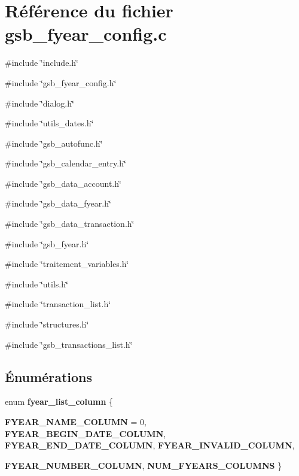 \section{Référence du fichier gsb\_\-fyear\_\-config.c}
\label{gsb__fyear__config_8c}
{\ttfamily \#include \char`\"{}include.h\char`\"{}}\par
{\ttfamily \#include \char`\"{}gsb\_\-fyear\_\-config.h\char`\"{}}\par
{\ttfamily \#include \char`\"{}dialog.h\char`\"{}}\par
{\ttfamily \#include \char`\"{}utils\_\-dates.h\char`\"{}}\par
{\ttfamily \#include \char`\"{}gsb\_\-autofunc.h\char`\"{}}\par
{\ttfamily \#include \char`\"{}gsb\_\-calendar\_\-entry.h\char`\"{}}\par
{\ttfamily \#include \char`\"{}gsb\_\-data\_\-account.h\char`\"{}}\par
{\ttfamily \#include \char`\"{}gsb\_\-data\_\-fyear.h\char`\"{}}\par
{\ttfamily \#include \char`\"{}gsb\_\-data\_\-transaction.h\char`\"{}}\par
{\ttfamily \#include \char`\"{}gsb\_\-fyear.h\char`\"{}}\par
{\ttfamily \#include \char`\"{}traitement\_\-variables.h\char`\"{}}\par
{\ttfamily \#include \char`\"{}utils.h\char`\"{}}\par
{\ttfamily \#include \char`\"{}transaction\_\-list.h\char`\"{}}\par
{\ttfamily \#include \char`\"{}structures.h\char`\"{}}\par
{\ttfamily \#include \char`\"{}gsb\_\-transactions\_\-list.h\char`\"{}}\par
\subsection*{Énumérations}
\begin{DoxyCompactItemize}
\item 
enum {\bf fyear\_\-list\_\-column} \{ \par
{\bf FYEAR\_\-NAME\_\-COLUMN} =  0, 
{\bf FYEAR\_\-BEGIN\_\-DATE\_\-COLUMN}, 
{\bf FYEAR\_\-END\_\-DATE\_\-COLUMN}, 
{\bf FYEAR\_\-INVALID\_\-COLUMN}, 
\par
{\bf FYEAR\_\-NUMBER\_\-COLUMN}, 
{\bf NUM\_\-FYEARS\_\-COLUMNS}
 \}
\end{DoxyCompactItemize}

